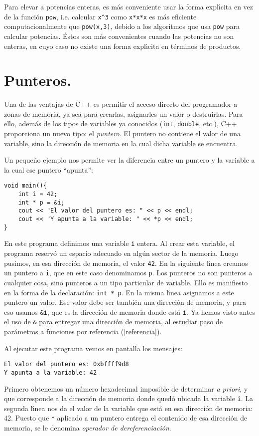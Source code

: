 Para elevar a potencias enteras, es m\'as conveniente usar la forma
expl\'{\i}cita en vez de la funci\'on \verb+pow+, i.e. calcular
\verb+x^3+ como \verb+x*x*x+ es m\'as eficiente computacionalmente que
\verb+pow(x,3)+, debido a los algoritmos que usa \verb+pow+ para
calcular potencias. \'Estos son m\'as convenientes cuando las
potencias no son enteras, en cuyo caso no existe una forma
expl\'{\i}cita en t\'erminos de productos.

\section{Punteros.}


Una de las ventajas de C++ es permitir el acceso directo del programador a
zonas de memoria, ya sea para crearlas, asignarles un valor o
destruirlas. Para ello, adem{\'a}s de los tipos de variables ya
conocidos (\verb+int+, \verb+double+, etc.), C++ proporciona un
nuevo tipo: el {\em puntero}. El puntero no contiene el valor de una variable,
sino la direcci{\'o}n de memoria en la cual dicha variable se
encuentra. 

Un peque{\~n}o ejemplo nos permite ver la diferencia entre un puntero y
la variable a la cual ese puntero ``apunta'':
\begin{verbatim}
void main(){
    int i = 42;
    int * p = &i;
    cout << "El valor del puntero es: " << p << endl;
    cout << "Y apunta a la variable: " << *p << endl;
}
\end{verbatim}

En este programa definimos una variable \verb+i+ entera. Al crear esta
variable, el programa reserv\'o un espacio  adecuado en
alg\'un sector de la memoria. Luego pusimos, en esa direcci\'on de
memoria, el valor \verb+42+. En la siguiente l\'{\i}nea creamos un
puntero a \verb+i+, que en este caso denominamos
\verb+p+. Los punteros no son punteros a cualquier cosa, sino
punteros a un tipo particular de variable. Ello es manifiesto en la
forma de la declaraci\'on: \verb+int * p+. En la misma l\'{\i}nea
asignamos a este puntero un valor. Ese valor debe ser tambi\'en una
direcci\'on de memoria, y para eso usamos \verb+&i+, que es la
direcci\'on de memoria donde est\'a \verb+i+. Ya hemos visto antes el
uso de \verb+&+ para entregar una direcci\'on de memoria, al estudiar
paso de par\'ametros a funciones por referencia (\ref{referencia}).

Al ejecutar este programa vemos en pantalla los mensajes:
\begin{verbatim}
El valor del puntero es: 0xbffff9d8
Y apunta a la variable: 42
\end{verbatim}
Primero obtenemos un n\'umero hexadecimal imposible
 de determinar {\em a priori\/}, y que
corresponde a la direcci{\'o}n de memoria donde qued{\'o} ubicada la
variable \verb+i+. La segunda l\'{\i}nea nos da el valor de la
variable que est{\'a} en esa direcci{\'o}n de memoria: 42. Puesto que
\verb+*+ aplicado a un puntero entrega el contenido de esa direcci\'on
de memoria, se le denomina {\em operador de dereferenciaci\'on}. 

